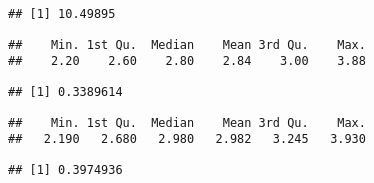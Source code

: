 \documentclass[
]{article}
\newenvironment{Shaded}{\begin{snugshade}}{\end{snugshade}}
\newcommand{\DataTypeTok}[1]{\textcolor[rgb]{0.13,0.29,0.53}{#1}}
\newcommand{\KeywordTok}[1]{\textcolor[rgb]{0.13,0.29,0.53}{\textbf{#1}}}
\newcommand{\NormalTok}[1]{#1}
\newcommand{\OperatorTok}[1]{\textcolor[rgb]{0.81,0.36,0.00}{\textbf{#1}}}
\newcommand{\StringTok}[1]{\textcolor[rgb]{0.31,0.60,0.02}{#1}}
\begin{document}
\begin{verbatim}
## [1] 10.49895
\end{verbatim}

\begin{Shaded}
\end{Shaded}

\begin{verbatim}
##    Min. 1st Qu.  Median    Mean 3rd Qu.    Max. 
##    2.20    2.60    2.80    2.84    3.00    3.88
\end{verbatim}

\begin{Shaded}
\end{Shaded}

\begin{verbatim}
## [1] 0.3389614
\end{verbatim}

\begin{Shaded}
\end{Shaded}

\begin{verbatim}
##    Min. 1st Qu.  Median    Mean 3rd Qu.    Max. 
##   2.190   2.680   2.980   2.982   3.245   3.930
\end{verbatim}

\begin{Shaded}
\end{Shaded}

\begin{verbatim}
## [1] 0.3974936
\end{verbatim}

\begin{Shaded}
\end{Shaded}
\end{document}
